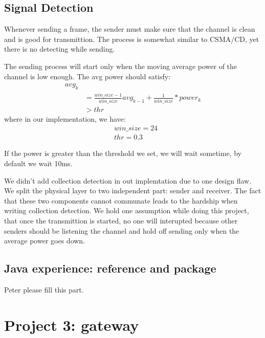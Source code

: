 \documentclass[conference,compsoc]{IEEEtran}
\begin{document}
	\subsection{Signal Detection}
		Whenever sending a frame, the sender must make sure that the channel is clean and is good for transmittion.
		The process is somewhat similar to CSMA/CD, yet there is no detecting while sending.
		\par
		The sending process will start only when the moving average power of the channel is low enough. The avg power should satisfy:
		\begin{equation}\begin{aligned}
		avg_k \\
		& = 
			\frac{win\_size-1}{win\_size}avg_{k-1} + 
			\frac{1}{win\_size} * power_k \\
		& > thr
		\end{aligned}\end{equation}
		where in our implementation, we have:
		\begin{equation*}\begin{aligned} 
			& win\_size = 24 \\
			& thr = 0.3 
		\end{aligned}\end{equation*}
		\par
		If the power is	greater than the threshold we set, we will wait sometime, by default we wait 10ms.
		\par 
		We didn't add collection detection in out implemtation due to one design flaw. We split the physical layer to two independent part: sender and receiver. The fact that these two components cannot communate leads to the hardship when writing collection detection. We hold one assumption while doing this project, that once the transmittion is started, no one will interupted because other senders should be listening the channel and hold off sending only when the average power goes down.
	\subsection{Java experience: reference and package}
		Peter please fill this part.

\section{Project 3: gateway}
	
\end{document}
